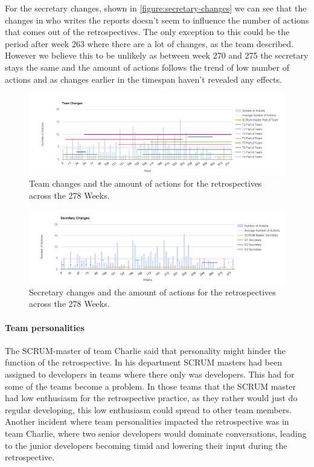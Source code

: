 For the secretary changes, shown in \autoref{figure:secretary-changes} we can see that the changes in who writes the reports doesn't seem to influence the number of actions that comes out of the retrospectives. The only exception to this could be the period after week 263 where there are a lot of changes, as the team described. However we believe this to be unlikely as between week 270 and 275 the secretary stays the same and the amount of actions follows the trend of low number of actions and as changes earlier in the timespan haven't revealed any effects. 

\begin{figure}
	\centering
	\includegraphics[width=\textwidth, keepaspectratio]{figures/team-changes.png}
	\caption{Team changes and the amount of actions for the retrospectives across the 278 Weeks.}
	\label{figure:team-changes}
\end{figure}

\begin{figure}
	\centering
	\includegraphics[width=\textwidth, keepaspectratio]{figures/secretary-changes.png}
	\caption{Secretary changes and the amount of actions for the retrospectives across the 278 Weeks.}
	\label{figure:secretary-changes}
\end{figure}
\afterpage{\clearpage}

\paragraph{Team personalities}
The SCRUM-master of team Charlie said that personality might hinder the function of the retrospective. In his department SCRUM masters had been assigned to developers in teams where there only was developers. This had for some of the teams become a problem. In those teams that the SCRUM master had low enthusiasm for the retrospective practice, as they rather would just do regular developing, this low enthusiasm could spread to other team members.  Another incident where team personalities impacted the retrospective was in team Charlie, where two senior developers would dominate conversations, leading to the junior developers becoming timid and lowering their input during the retrospective.


